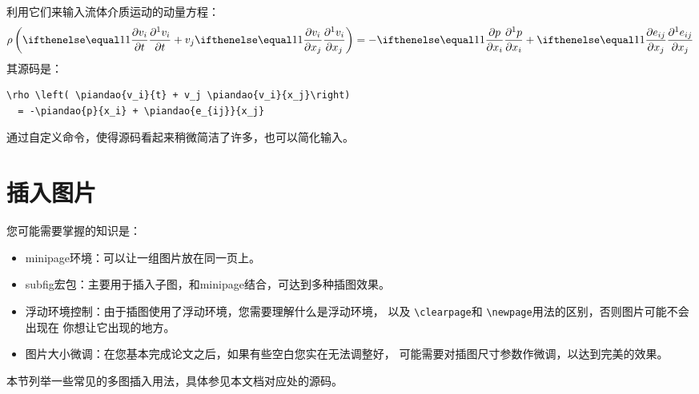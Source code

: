 利用它们来输入流体介质运动的动量方程：
\begin{equation}
  \rho \left( \piandao{v_i}{t} + v_j \piandao{v_i}{x_j}\right)
  = -\piandao{p}{x_i} + \piandao{e_{ij}}{x_j}
\end{equation}
其源码是：
\begin{Verbatim}[]
  \rho \left( \piandao{v_i}{t} + v_j \piandao{v_i}{x_j}\right)
  = -\piandao{p}{x_i} + \piandao{e_{ij}}{x_j}
\end{Verbatim}
通过自定义命令，使得源码看起来稍微简洁了许多，也可以简化输入。

\section{插入图片}
您可能需要掌握的知识是：
\begin{itemize}
\itemsep=0pt \parskip=0pt
  \item minipage环境：可以让一组图片放在同一页上。
  \item subfig宏包：主要用于插入子图，和minipage结合，可达到多种插图效果。
  \item 浮动环境控制：由于插图使用了浮动环境，您需要理解什么是浮动环境，%
  以及 \verb"\clearpage"和 \verb"\newpage"用法的区别，否则图片可能不会出现在%
  你想让它出现的地方。
  \item 图片大小微调：在您基本完成论文之后，如果有些空白您实在无法调整好，%
  可能需要对插图尺寸参数作微调，以达到完美的效果。
\end{itemize}
本节列举一些常见的多图插入用法，具体参见本文档对应处的源码。


